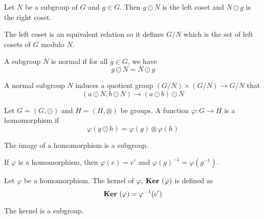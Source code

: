 \begin{definition}
    Let $N$ be a subgroup of $G$ and $g \in G$. Then $g \odot N$ is the left coset and $N \odot g$ is the right coset.
    
    The left coset is an equivalent relation so it defines $G/N$ which is the set of left cosets of $G$ modulo $N$.
\end{definition}

\begin{definition}
    A subgroup $N$ is normal if for all $g \in G$, we have 
    \begin{equation}
        g \odot N = N \odot g
    \end{equation}    
\end{definition}

\begin{definition}
    A normal subgroup $N$ induces a quotient group $(G/N) \times (G/N) \rightarrow G/N$ that 
    \begin{equation}
        (a \odot N, b \odot N) \rightarrow (a \odot b) \odot N
    \end{equation} 
\end{definition}

\begin{definition}
    Let $G = (G, \odot)$ and $H = (H, \otimes)$ be groups. A function $\varphi: G \rightarrow H$ is a homomorphism if 
    \begin{equation}
        \varphi(g \odot h) = \varphi(g) \otimes \varphi(h)
    \end{equation}
    
    The image of a homomorphism is a subgroup.
\end{definition}

\begin{theorem}
    If $\varphi$ is a homomorphism, then $\varphi(e) = e'$ and $\varphi(g)^{-1} = \varphi(g^{-1})$.
\end{theorem}

\begin{definition}
    Let $\varphi$ be a homomorphism. The kernel of $\varphi$, $\displaystyle \mathop{\bf Ker\/}~( \varphi )$ is defined as
    \begin{equation}
        \displaystyle \mathop{\bf Ker\/}~( \varphi ) = \varphi^{-1}(e')
    \end{equation}
    
    The kernel is a subgroup.
\end{definition}

